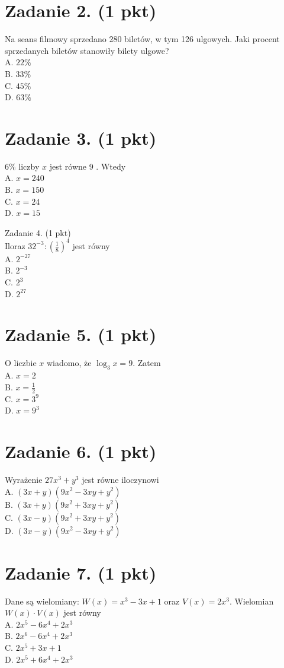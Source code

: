 \documentclass[10pt]{article}
\begin{document}
\section*{Zadanie 2. (1 pkt)}
Na seans filmowy sprzedano 280 biletów, w tym 126 ulgowych. Jaki procent sprzedanych biletów stanowiły bilety ulgowe?\\
A. \(22 \%\)\\
B. \(33 \%\)\\
C. \(45 \%\)\\
D. \(63 \%\)

\section*{Zadanie 3. (1 pkt)}
\(6 \%\) liczby \(x\) jest równe 9 . Wtedy\\
A. \(x=240\)\\
B. \(x=150\)\\
C. \(x=24\)\\
D. \(x=15\)

Zadanie 4. (1 pkt)\\
Iloraz \(32^{-3}:\left(\frac{1}{8}\right)^{4}\) jest równy\\
A. \(2^{-27}\)\\
B. \(2^{-3}\)\\
C. \(2^{3}\)\\
D. \(2^{27}\)

\section*{Zadanie 5. (1 pkt)}
O liczbie \(x\) wiadomo, że \(\log _{3} x=9\). Zatem\\
A. \(x=2\)\\
B. \(x=\frac{1}{2}\)\\
C. \(x=3^{9}\)\\
D. \(x=9^{3}\)

\section*{Zadanie 6. (1 pkt)}
Wyrażenie \(27 x^{3}+y^{3}\) jest równe iloczynowi\\
A. \((3 x+y)\left(9 x^{2}-3 x y+y^{2}\right)\)\\
B. \((3 x+y)\left(9 x^{2}+3 x y+y^{2}\right)\)\\
C. \((3 x-y)\left(9 x^{2}+3 x y+y^{2}\right)\)\\
D. \((3 x-y)\left(9 x^{2}-3 x y+y^{2}\right)\)

\section*{Zadanie 7. (1 pkt)}
Dane są wielomiany: \(W(x)=x^{3}-3 x+1\) oraz \(V(x)=2 x^{3}\). Wielomian \(W(x) \cdot V(x)\) jest równy\\
A. \(2 x^{5}-6 x^{4}+2 x^{3}\)\\
B. \(2 x^{6}-6 x^{4}+2 x^{3}\)\\
C. \(2 x^{5}+3 x+1\)\\
D. \(2 x^{5}+6 x^{4}+2 x^{3}\)
\end{document}
